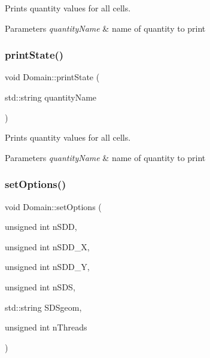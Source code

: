 Prints quantity values for all cells. 


\begin{DoxyParams}{Parameters}
{\em quantity\+Name} & name of quantity to print \\
\hline
\end{DoxyParams}
\mbox{\label{classDomain_a1163559d75540c4cd29c7aa775feca80}} 
\subsubsection{\texorpdfstring{print\+State()}{printState()}\hspace{0.1cm}{\footnotesize\ttfamily [2/2]}}
{\footnotesize\ttfamily void Domain\+::print\+State (\begin{DoxyParamCaption}\item[{std\+::string}]{quantity\+Name }\end{DoxyParamCaption})}



Prints quantity values for all cells. 


\begin{DoxyParams}{Parameters}
{\em quantity\+Name} & name of quantity to print \\
\hline
\end{DoxyParams}
\mbox{\label{classDomain_a10a5e8384b21bb3c968699c2a6c89bf7}} 
\subsubsection{\texorpdfstring{set\+Options()}{setOptions()}\hspace{0.1cm}{\footnotesize\ttfamily [1/2]}}
{\footnotesize\ttfamily void Domain\+::set\+Options (\begin{DoxyParamCaption}\item[{unsigned int}]{n\+S\+DD,  }\item[{unsigned int}]{n\+S\+D\+D\+\_\+X,  }\item[{unsigned int}]{n\+S\+D\+D\+\_\+Y,  }\item[{unsigned int}]{n\+S\+DS,  }\item[{std\+::string}]{S\+D\+Sgeom,  }\item[{unsigned int}]{n\+Threads }\end{DoxyParamCaption})}



